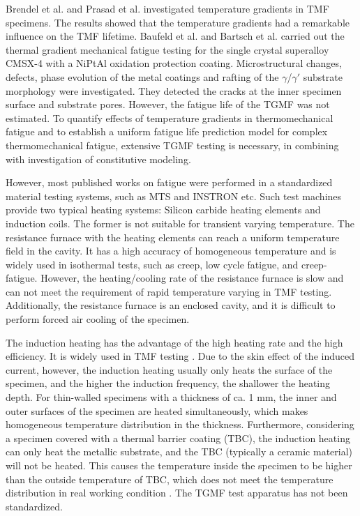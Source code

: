 \documentclass[preprint,5p,twocolumn,10pt,sort&compress]{elsarticle}
\begin{document}
Brendel et al. \cite{BRENDEL2008234} and Prasad et al. \cite{PRASAD2013131} investigated temperature gradients in TMF specimens. The results showed that the temperature gradients had a remarkable influence on the TMF lifetime.
Baufeld et al. \cite{BAUFELD2008219} and Bartsch et al. \cite{BARTSCH2008211} carried out the thermal gradient mechanical fatigue testing for the single crystal superalloy CMSX-4 with a NiPtAl oxidation protection coating.
Microstructural changes, defects, phase evolution of the metal coatings and rafting of the $\gamma$/$\gamma'$ substrate morphology were investigated. They detected the cracks at the inner specimen surface and substrate pores. However, the fatigue life of the TGMF was not estimated. To quantify effects of temperature gradients in thermomechanical fatigue and to establish a uniform fatigue life prediction model for complex thermomechanical fatigue, extensive TGMF testing is necessary, in combining with investigation of constitutive modeling.

However, most published works on fatigue were performed in a standardized material testing systems, such as MTS and INSTRON etc. Such test machines provide two typical heating systems: Silicon carbide heating elements and induction coils. The former is not suitable for transient varying temperature. 
The resistance furnace with the heating elements can reach a uniform temperature field in the cavity. It has a high accuracy of homogeneous temperature and is widely used in isothermal tests, such as creep, low cycle fatigue, and creep-fatigue. However, the heating/cooling rate of the resistance furnace is slow and can not meet the requirement of rapid temperature varying in TMF testing. Additionally, the resistance furnace is an enclosed cavity, and it is difficult to perform forced air cooling of the specimen.

The induction heating has the advantage of the high heating rate and the high efficiency. It is widely used in TMF testing \cite{Mao2015, Wang2017, SUN2019228,DENG2019813,BRENDEL2008234}.
Due to the skin effect of the induced current, however, the induction heating usually only heats the surface of the specimen, and the higher the induction frequency, the shallower the heating depth. For thin-walled specimens with a thickness of ca. 1 mm, the inner and outer surfaces of the specimen are heated simultaneously, which makes homogeneous temperature distribution in the thickness. Furthermore, considering a specimen covered with a thermal barrier coating (TBC), the induction heating can only heat the metallic substrate, and the TBC (typically a ceramic material) will not be heated. This causes the temperature inside the specimen to be higher than the outside temperature of TBC, which does not meet the temperature distribution in real working condition \cite{BRENDEL2008234}. The TGMF test apparatus has not been standardized. 
\end{document}
